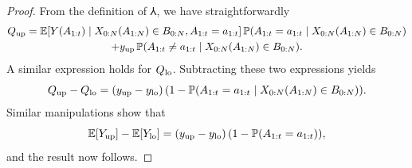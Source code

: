\begin{proof}
From the definition of $\Yup$, we have straightforwardly
\begin{multline*}
    Q_{\mathrm{up}} = \mathbb{E}[Y(A_{1:t}) \mid X_{0:N}(A_{1:N}) \in B_{0:N}, A_{1:t} = a_{1:t}] \, \mathbb{P}(A_{1:t} = a_{1:t} \mid X_{0:N}(A_{1:N}) \in B_{0:N}) \\
            +  y_{\mathrm{up}} \, \mathbb{P}(A_{1:t} \neq a_{1:t} \mid X_{0:N}(A_{1:N}) \in B_{0:N}).
\end{multline*}
A similar expression holds for $Q_{\mathrm{lo}}$.
Subtracting these two expressions yields
\[
    Q_{\mathrm{up}} - Q_{\mathrm{lo}} = (y_{\mathrm{up}} - y_{\mathrm{lo}}) \, (1 - \mathbb{P}(A_{1:t}=a_{1:t} \mid X_{0:N}(A_{1:N}) \in B_{0:N})). 
\]
Similar manipulations show that
\[
    \mathbb{E}[Y_{\mathrm{up}}] - \mathbb{E}[Y_{\mathrm{lo}}] = (y_{\mathrm{up}} - y_{\mathrm{lo}}) \, (1 - \mathbb{P}(A_{1:t}=a_{1:t})),
\]
and the result now follows.




\end{proof}
